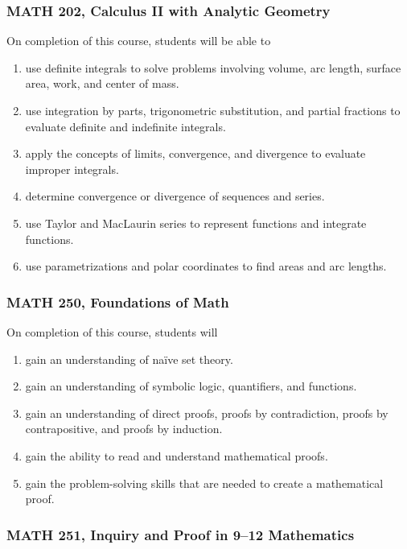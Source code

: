 \documentclass[11pt]{article}
\newenvironment{alphalist}{
\begin{enumerate}[label=(\arabic*),widest=107 ,leftmargin=25pt, itemsep=0pt]}
{\end{enumerate}}
\begin{document}
\subsubsection{MATH 202, Calculus II with Analytic Geometry}

 On completion of this course, students will be able to
 \begin{alphalist}
    \item use definite integrals to solve problems involving volume, arc length, 
       surface area, work, and center of mass. 
    \item use integration by parts, trigonometric substitution, and partial fractions 
        to evaluate definite and indefinite integrals.
    \item apply the concepts of limits, convergence, and divergence to evaluate 
        improper integrals.
    \item determine convergence or divergence of sequences and series.
    \item use Taylor and MacLaurin series to represent functions and integrate 
        functions.
    \item use parametrizations and polar coordinates to find areas and arc lengths.
 \end{alphalist}

\subsubsection{MATH 250, Foundations of Math}

On completion of this course, students will
\begin{alphalist}
    \item gain an understanding of na\"ive set theory. 
    \item gain an understanding of symbolic logic, quantifiers, and functions.
    \item gain an understanding of direct proofs, proofs by contradiction, proofs by contrapositive, and proofs by induction.
    \item gain the ability to read and understand mathematical proofs.
    \item gain the problem-solving skills that are needed to create a mathematical proof.
\end{alphalist}

\subsubsection{MATH 251, Inquiry and Proof in 9--12 Mathematics}
\end{document}
